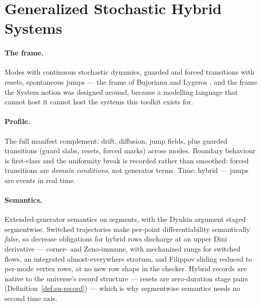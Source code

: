

\section{Generalized Stochastic Hybrid Systems}
\label{sec:mt-gshs}

\paragraph{The frame.} Modes with continuous stochastic dynamics,
guarded and forced transitions with resets, spontaneous jumps ---
the frame of Bujorianu and Lygeros \cite{bujorianu08}, and the frame
the System notion was designed around, because a modelling
language that cannot host it cannot host the systems this toolkit
exists for.

\paragraph{Profile.} The full manifest complement: drift, diffusion,
jump fields, plus guarded transitions (guard slabs, resets, forced
marks) across modes. Boundary behaviour is first-class and the
uniformity break is recorded rather than smoothed: forced transitions
are \emph{domain conditions}, not generator terms. Time: hybrid ---
jumps are events in real time.

\paragraph{Semantics.} Extended-generator semantics on segments,
with the Dynkin argument staged segmentwise. Switched trajectories
make per-point differentiability semantically \emph{false}, so
decrease obligations for hybrid rows discharge at an upper Dini
derivative --- corner- and Zeno-immune, with mechanized rungs for
switched flows, an integrated almost-everywhere stratum, and Filippov
sliding reduced to per-mode vertex rows, at no new row shape in the
checker. Hybrid records are native to the universe's record
structure --- resets are zero-duration stage pairs
(Definition~\ref{def:su-record}) --- which is why segmentwise
semantics needs no second time axis.

